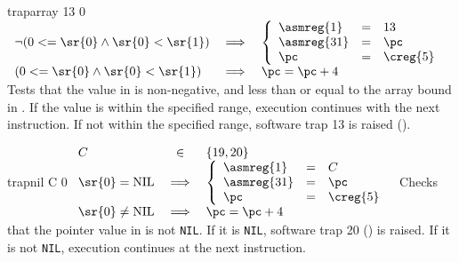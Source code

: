 \begin{instruction}{traparray}\label{inst:traparray}
     {13}
     {0}
     { %
       \begin{math}
         \begin{array}{lcl}
           \neg (0 <= \sr{0} \wedge \sr{0} < \sr{1}) & \implies &
           \left\lbrace
           \begin{array}{lcl}
             \asmreg{1} & = & 13 \\
             \asmreg{31} & = & \pc \\
             \pc & = & \creg{5} \\
           \end{array}
           \right. \\

           (0 <= \sr{0} \wedge \sr{0} < \sr{1}) & \implies & \pc = \pc + 4 \\
         \end{array}
       \end{math}
     }
     {
       Tests that the value in  is non-negative, and less than
       or equal to the array bound in .  If the value is within
       the specified range, execution continues with the next
       instruction.  If not within the specified range, software trap
       13 is raised ().
     }
\end{instruction}


\begin{instruction}{trapnil}\label{inst:trapnil}
     {C}
     {0}
     { %
       \begin{math}
         \begin{array}{lcl}
           C & \in & \lbrace 19, 20 \rbrace \\
           \sr{0} = \textrm{NIL} & \implies &
           \left\lbrace
           \begin{array}{lcl}
             \asmreg{1} & = & C \\
             \asmreg{31} & = & \pc \\
             \pc & = & \creg{5} \\
           \end{array}
           \right. \\
           \sr{0} \neq \textrm{NIL} & \implies & \pc = \pc + 4 \\
         \end{array}
       \end{math}
     }
     {
       Checks that the pointer value in  is not \texttt{NIL}.
       If it is \texttt{NIL}, software trap 20 () is
       raised.  If it is not \texttt{NIL}, execution continues at the
       next instruction.
     }
\end{instruction}


